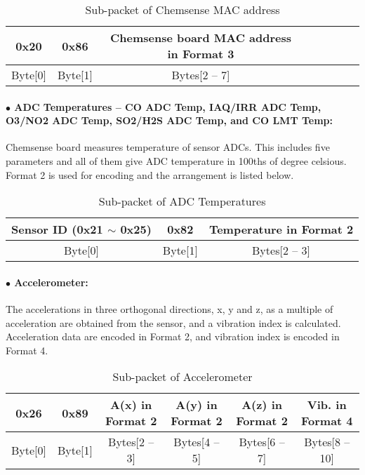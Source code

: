 \begin{table}[h!]
    \centering
    \caption{Sub-packet of Chemsense MAC address}
    \begin{tabular}{|c|c|c|c|c|c|c|c|}
        \hline
        \rowcolor{black!8}
        \textbf{0x20} & \textbf{0x86} & \textbf{Chemsense board MAC address in Format 3}\\
        \hline
        Byte[0] & Byte[1] & Bytes[2 -- 7] \\ \hline
    \end{tabular}
\end{table}


\paragraph{$\bullet$ ADC Temperatures -- CO ADC Temp, IAQ/IRR ADC Temp, O3/NO2 ADC Temp, SO2/H2S ADC Temp, and CO LMT Temp:}
Chemsense board measures temperature of sensor ADCs. This includes five parameters and 
all of them give ADC temperature in 100ths of degree celsious. Format 2 is used for encoding and the arrangement is listed below. 


\begin{table}[h!]
    \centering
    \caption{Sub-packet of ADC Temperatures}
    \begin{tabular}{|c|c|c|}
        \hline
        \rowcolor{black!8}
        \textbf{Sensor ID} (0x21 $\sim$ 0x25) & \textbf{0x82} & \textbf{Temperature in Format 2}\\
        \hline
        Byte[0] & Byte[1] & Bytes[2 -- 3] \\ \hline
    \end{tabular}
\end{table}


\paragraph{$\bullet$ Accelerometer:}
The accelerations in three orthogonal directions, x, y and z, as a multiple of acceleration are obtained from the sensor, and a vibration index is calculated. 
Acceleration data are encoded in Format 2, and vibration index is encoded in Format 4. 

\begin{table}[h!]
    \centering
    \caption{Sub-packet of Accelerometer}
    \begin{tabular}{|c|c|c|c|c|c|}
        \hline
        \rowcolor{black!8}
        \textbf{0x26} & \textbf{0x89} & \textbf{A(x) in Format 2} & \textbf{A(y) in Format 2} & \textbf{A(z) in Format 2}& \textbf{Vib. in Format 4}\\
        \hline
        Byte[0] & Byte[1] & Bytes[2 -- 3] & Bytes[4 -- 5] & Bytes[6 -- 7] & Bytes[8 -- 10] \\ \hline
    \end{tabular}
\end{table}



